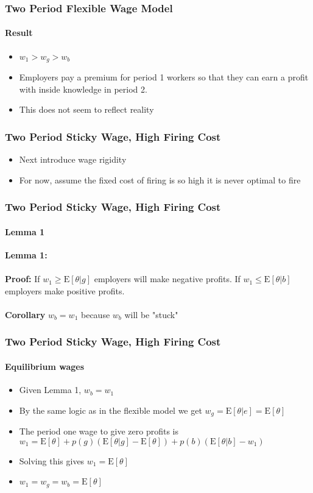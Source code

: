 \documentclass{beamer}
\newcommand{\E}{\mathrm{E}}
\begin{document}
\begin{frame}
\frametitle{Two Period Flexible Wage Model}
\framesubtitle{Result}

\begin{itemize}
	\setlength{\itemsep}{10mm}
	\item $w_1 > w_g > w_b$
	\item Employers pay a premium for period 1 workers so that they can earn a profit with inside knowledge in period 2. 
	\item This does not seem to reflect reality
\end{itemize}

\end{frame}


\begin{frame}
\frametitle{Two Period Sticky Wage, High Firing Cost}

\begin{itemize}
	\setlength{\itemsep}{10mm}
	\item Next introduce wage rigidity 
	\item For now, assume the fixed cost of firing is so high it is never optimal to fire
\end{itemize}

\end{frame}



\begin{frame}
\frametitle{Two Period Sticky Wage, High Firing Cost}
\framesubtitle{Lemma 1}

\textbf{Lemma 1:} \text{With sticky wages $w_1 \in (\E[\theta|b], \E[\theta | g])$} \\~\\

\textbf{Proof:} If $w_1 \geq \E[\theta | g] $ employers will make negative profits. If  $w_1 \leq \E[\theta | b] $ employers make positive profits. \\~\\

\textbf{Corollary} $w_b = w_1$ because $w_b$ will be "stuck"
\end{frame}



\begin{frame}
\frametitle{Two Period Sticky Wage, High Firing Cost}
\framesubtitle{Equilibrium wages }

\begin{itemize}
	\setlength{\itemsep}{3mm}
	\item Given Lemma 1, $w_b = w_1$
	\item By the same logic as in the flexible model we get $w_g = \E[\theta|e] = \E[\theta]$

	\item The period one wage to give zero profits is $w_1 = \E[\theta] + p(g)(\E[\theta|g] - \E[\theta]) + p(b)(\E[\theta|b] - w_1)$
	\item Solving this gives $w_1 = \E[\theta]$ 
	\item $w_1 = w_g = w_b = \E[\theta]$
	\end{itemize}
\end{frame}
\end{document}
